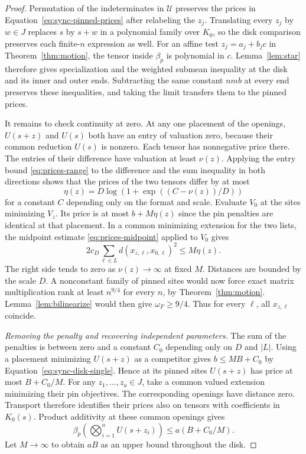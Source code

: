 \begin{proof}
Permutation of the indeterminates in $\mathcal U$ preserves the prices
in Equation~\eqref{eq:sync-pinned-prices} after relabeling the $z_j$.
Translating every $z_j$ by $w\in J$ replaces $s$ by $s+w$ in a
polynomial family over $K_0$, so the disk comparison preserves each
finite-$n$ expression as well. For an affine test $z_j=a_j+b_jc$ in
Theorem~\ref{thm:motion}, the tensor inside $\beta_p$ is polynomial in
$c$. Lemma~\ref{lem:star} therefore gives specialization and the
weighted submean inequality at the disk and its inner and outer
ends. Subtracting the same constant $nmb$ at every end preserves these
inequalities, and taking the limit transfers them to the pinned prices.

It remains to check continuity at zero. At any one placement of the
openings, $U(s+z)$ and $U(s)$ both have an entry of valuation zero,
because their common reduction $U(s)$ is nonzero. Each tensor has
nonnegative price there. The entries of their difference have
valuation at least $\nu(z)$. Applying the entry bound
\eqref{eq:prices-range} to the difference and the sum inequality in
both directions shows that the prices of the two tensors differ by
at most
\[
      \eta(z)=D\log\!\left(1+\exp((C-\nu(z))/D)\right)
\]
for a constant $C$ depending only on the format and scale. Evaluate
$V_0$ at the sites minimizing $V_z$. Its price is at most
$b+M\eta(z)$ since the pin penalties are identical at that placement.
In a common minimizing extension for the two lists, the midpoint
estimate \eqref{eq:prices-midpoint} applied to $V_0$ gives
\[
  2c_D\sum_{\ell\in L}d(x_{z,\ell},x_{0,\ell})^2 \le M\eta(z).
\]
The right side tends to zero as $\nu(z)\to\infty$ at fixed $M$.
Distances are bounded by the scale $D$. A nonconstant family of
pinned sites would now force exact matrix multiplication rank at
least $n^{9/4}$ for every $n$, by Theorem~\ref{thm:motion}.
Lemma~\ref{lem:bilinearize} would then give
$\omega_F\ge9/4$. Thus for every $\ell$, all $x_{z,\ell}$ coincide.

\smallskip\noindent\emph{Removing the penalty and recovering independent parameters.}
The sum of the penalties is between zero and a constant $C_0$
depending only on $D$ and $|L|$. Using a placement minimizing
$U(s+z)$ as a competitor gives $b\le MB+C_0$ by
Equation~\eqref{eq:sync-disk-single}. Hence at its pinned sites
$U(s+z)$ has price at most $B+C_0/M$. For any $z_1,\ldots,z_a\in J$,
take a common valued extension minimizing their pin objectives.
The corresponding openings have distance zero. Transport therefore
identifies their prices also on tensors with coefficients in $K_0(s)$.
Product additivity at these common openings gives
\[
  \beta_p\!\left(\bigotimes_{i=1}^aU(s+z_i)\right)
       \le a(B+C_0/M).
\]
Let $M\to\infty$ to obtain $aB$ as an upper bound throughout the disk.


\end{proof}
